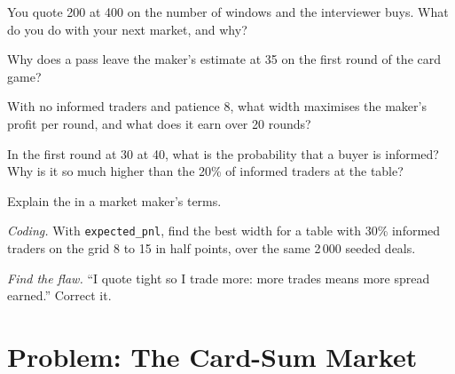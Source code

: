 \begin{exercise}[$\star$]\label{exo:m2:market-making-games:2}
You quote 200 at 400 on the number of windows and the interviewer buys. What do you do
with your next market, and why?
\end{exercise}

\begin{exercise}[$\star$]\label{exo:m2:market-making-games:3}
Why does a pass leave the maker's estimate at 35 on the first round of the card game?
\end{exercise}

\begin{exercise}[$\star\star$]\label{exo:m2:market-making-games:4}
With no informed traders and patience 8, what width maximises the maker's profit per
round, and what does it earn over 20 rounds?
\end{exercise}

\begin{exercise}[$\star\star$]\label{exo:m2:market-making-games:5}
In the first round at 30 at 40, what is the probability that a buyer is informed? Why is
it so much higher than the 20\% of informed traders at the table?
\end{exercise}

\begin{exercise}[$\star\star$]\label{exo:m2:market-making-games:6}
Explain the  in a market maker's terms.
\end{exercise}

\begin{exercise}[$\star\star\star$]\label{exo:m2:market-making-games:7}
\emph{Coding.} With \texttt{expected\_pnl}, find the best width for a table with 30\%
informed traders on the grid 8 to 15 in half points, over the same 2\,000 seeded deals.
\end{exercise}

\begin{exercise}[$\star\star\star$]\label{exo:m2:market-making-games:8}
\emph{Find the flaw.} ``I quote tight so I trade more: more trades means more spread
earned.'' Correct it.
\end{exercise}

\section{Problem: The Card-Sum Market}

